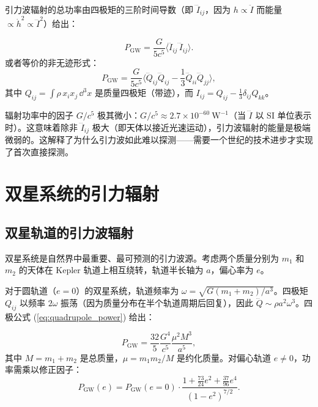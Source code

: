 引力波辐射的总功率由四极矩的三阶时间导数（即 $\dddot{I}_{ij}$，因为 $h \propto \ddot{I}$ 而能量 $\propto \dot{h}^2 \propto \dddot{I}^2$）给出：

\begin{theorem}
\begin{equation}
    \boxed{P_{\text{GW}} = \frac{G}{5c^5} \langle \dddot{I}_{ij} \, \dddot{I}_{ij} \rangle}.
    \label{eq:quadrupole_power}
\end{equation}
或者等价的非无迹形式：
\begin{equation}
    P_{\text{GW}} = \frac{G}{5c^5} \langle \dddot{Q}_{ij} \dddot{Q}_{ij} - \frac{1}{3}\dddot{Q}_{ii}\dddot{Q}_{jj} \rangle,
\end{equation}
其中 $Q_{ij} = \int \rho\, x_i x_j \,\dd^3x$ 是质量四极矩（带迹），而 $I_{ij} = Q_{ij} - \frac{1}{3}\delta_{ij}Q_{kk}$。
\end{theorem}

\begin{note}[$c^{-5}$ 因子的物理意义]
辐射功率中的因子 $G/c^5$ 极其微小：$G/c^5 \approx 2.7 \times 10^{-60}\ \text{W}^{-1}$（当 $\dddot{I}$ 以 SI 单位表示时）。这意味着除非 $\dddot{I}_{ij}$ 极大（即天体以接近光速运动），引力波辐射的能量是极端微弱的。这解释了为什么引力波如此难以探测——需要一个世纪的技术进步才实现了首次直接探测。
\end{note}

\section{双星系统的引力辐射}
\label{sec:binary_systems}

\subsection{双星轨道的引力波辐射}

双星系统是自然界中最重要、最可预测的引力波源。考虑两个质量分别为 $m_1$ 和 $m_2$ 的天体在 Kepler 轨道上相互绕转，轨道半长轴为 $a$，偏心率为 $e$。

对于圆轨道（$e=0$）的双星系统，轨道频率为 $\omega = \sqrt{G(m_1+m_2)/a^3}$。四极矩 $Q_{ij}$ 以频率 $2\omega$ 振荡（因为质量分布在半个轨道周期后回复），因此 $\dddot{Q} \sim \rho a^2 \omega^3$。四极公式 (\ref{eq:quadrupole_power}) 给出：

\begin{theorem}[圆轨道双星的引力波辐射]
\begin{equation}
    \boxed{P_{\text{GW}} = \frac{32}{5}\frac{G^4}{c^5}\frac{\mu^2 M^3}{a^5}},
    \label{eq:circular_power}
\end{equation}
其中 $M = m_1 + m_2$ 是总质量，$\mu = m_1m_2/M$ 是约化质量。对偏心轨道 $e \neq 0$，功率需乘以修正因子：
\begin{equation}
    P_{\text{GW}}(e) = P_{\text{GW}}(e=0) \cdot \frac{1 + \frac{73}{24}e^2 + \frac{37}{96}e^4}{(1-e^2)^{7/2}}.
    \label{eq:eccentric_correction}
\end{equation}
\end{theorem}

